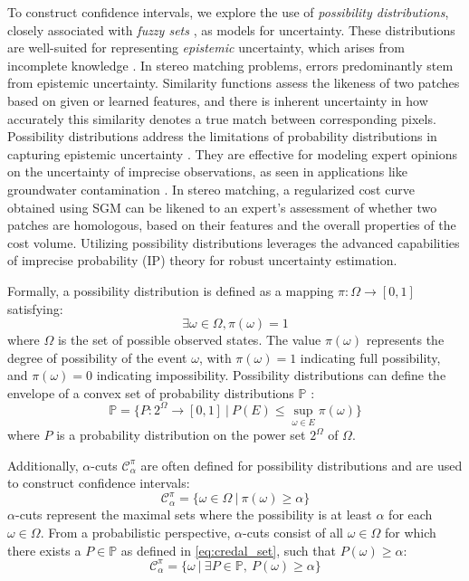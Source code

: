 To construct confidence intervals, we explore the use of \textit{possibility distributions}, closely associated with \textit{fuzzy sets} \cite{dubois_random_1991}, as models for uncertainty. These distributions are well-suited for representing \textit{epistemic} uncertainty, which arises from incomplete knowledge \cite{baudrit_joint_2007}. In stereo matching problems, errors predominantly stem from epistemic uncertainty. Similarity functions assess the likeness of two patches based on given or learned features, and there is inherent uncertainty in how accurately this similarity denotes a true match between corresponding pixels. Possibility distributions address the limitations of probability distributions in capturing epistemic uncertainty \cite{walley_statistical_1991}. They are effective for modeling expert opinions on the uncertainty of imprecise observations, as seen in applications like groundwater contamination \cite{bardossy_l-_1995, baudrit_joint_2007}. In stereo matching, a regularized cost curve obtained using SGM can be likened to an expert's assessment of whether two patches are homologous, based on their features and the overall properties of the cost volume. Utilizing possibility distributions leverages the advanced capabilities of imprecise probability (IP) theory for robust uncertainty estimation.

Formally, a possibility distribution is defined as a mapping $\pi: \Omega \rightarrow [0,1]$ satisfying:
\begin{equation}
	\exists \omega \in \Omega, \pi(\omega) = 1 \label{eq:possibility}
\end{equation}
where $\Omega$ is the set of possible observed states. The value $\pi(\omega)$ represents the degree of possibility of the event $\omega$, with $\pi(\omega) = 1$ indicating full possibility, and $\pi(\omega) = 0$ indicating impossibility. Possibility distributions can define the envelope of a convex set of probability distributions $\mathbb{P}$ \cite{dubois_when_1992}:
\begin{equation}
    \mathbb{P} = \{ P: 2^\Omega \rightarrow [0,1]~|~P(E) \leqslant \sup_{\omega \in E} \pi(\omega) \} \label{eq:credal_set}
\end{equation}
where $P$ is a probability distribution on the power set $2^\Omega$ of $\Omega$.

Additionally, $\alpha$-cuts $\mathcal{C}^{\pi}_\alpha$ are often defined for possibility distributions and are used to construct confidence intervals:
\begin{equation}
	\mathcal{C}_\alpha^\pi = \{ \omega \in \Omega~|~\pi(\omega) \geqslant \alpha \} \label{eq:alpha_cut}
\end{equation}
$\alpha$-cuts represent the maximal sets where the possibility is at least $\alpha$ for each $\omega \in \Omega$. From a probabilistic perspective, $\alpha$-cuts consist of all $\omega \in \Omega$ for which there exists a $P \in \mathbb{P}$ as defined in \cref{eq:credal_set}, such that $P(\omega) \geqslant \alpha$:
\begin{equation}
    \mathcal{C}_\alpha^\pi = \{ \omega~|~\exists P \in \mathbb{P},~P(\omega) \geqslant \alpha \} \label{eq:alpha_proba}
\end{equation}



